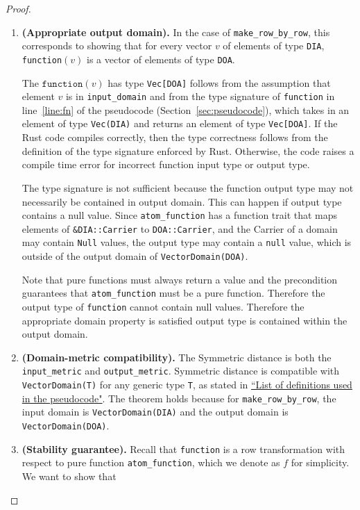 \documentclass[11pt,a4paper]{article}
\newcommand{\function}{\texttt{function}}
\begin{document}
\begin{proof}
\begin{enumerate}
\item \textbf{(Appropriate output domain).} In the case of \texttt{make\_row\_by\_row}, this corresponds to showing that for every vector $v$ of elements of type \texttt{DIA}, \texttt{function}$(v)$ is a vector of elements of type \texttt{DOA}. 

The $\function(v)$ has type \texttt{Vec[DOA]} follows from the assumption that element $v$ is in \texttt{input\_domain} and from the type signature of \texttt{function} in line~\ref{line:fn} of the pseudocode (Section~\ref{sec:pseudocode}), which takes in an element of type \texttt{Vec(DIA)} and returns an element of type \texttt{Vec[DOA]}. If the Rust code compiles correctly, then the type correctness follows from the definition of the type signature enforced by Rust. Otherwise, the code raises a compile time error for incorrect function input type or output type. 

The type signature is not sufficient because the function output type may not necessarily be contained in output domain. This can happen if output type contains a null value. Since \texttt{atom\_function} has a function trait that maps elements of \texttt{&DIA::Carrier} to \texttt{DOA::Carrier}, and the Carrier of a domain may contain \texttt{Null} values, the output type may contain a \texttt{null} value, which is outside of the output domain of \texttt{VectorDomain(DOA)}.

Note that pure functions must always return a value and the precondition guarantees that \texttt{atom\_function} must be a pure function. Therefore the output type of \texttt{function} cannot contain null values. Therefore the appropriate domain property is satisfied output type is contained within the output domain.


\item \textbf{(Domain-metric compatibility).} The Symmetric distance is both the \texttt{input\_metric} and \texttt{output\_metric}. Symmetric distance is compatible with \texttt{VectorDomain(T)} for any generic type \texttt{T}, as stated in \href{https://www.overleaf.com/project/60d215bf90b337ac02200a99}{``List of definitions used in the pseudocode"}. The theorem holds because for \texttt{make\_row\_by\_row}, the input domain is \texttt{VectorDomain(DIA)} and the output domain is \texttt{VectorDomain(DOA)}. 


\item \textbf{(Stability guarantee).} 
Recall that \texttt{function} is a row transformation with respect to pure function \texttt{atom\_function}, which we denote as $f$ for simplicity. We want to show that


\end{enumerate}
\end{proof}
\end{document}
